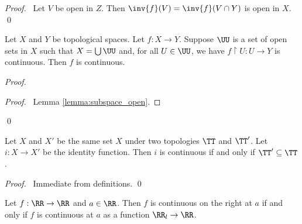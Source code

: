 \begin{proof}
    \pf\ Let $V$ be open in $Z$. Then $\inv{f}(V) = \inv{f}(V \cap Y)$ is open in $X$. \qed
\end{proof}

\begin{theorem}
    Let $X$ and $Y$ be topological spaces. Let $f : X \rightarrow Y$. Suppose $\UU$ is a set of open sets
    in $X$ such that $X = \bigcup \UU$ and, for all $U \in \UU$, we have $f \restriction U : U \rightarrow Y$
    is continuous. Then $f$ is continuous.
\end{theorem}

\begin{proof}
    \pf
    \begin{proof}
        \pf\ Lemma \ref{lemma:subspace_open}.
    \end{proof}
    \qed
\end{proof}

\begin{proposition}
    Let $X$ and $X'$ be the same set $X$ under two topologies $\TT$ and $\TT'$. Let $i : X \rightarrow X'$
    be the identity function. Then $i$ is continuous if and only if $\TT' \subseteq \TT$.
\end{proposition}

\begin{proof}
    \pf\ Immediate from definitions. \qed
\end{proof}

\begin{proposition}
    Let $f : \RR \rightarrow \RR$ and $a \in \RR$. Then $f$ is continuous on the right at $a$ if and only if
    $f$ is continuous at $a$ as a function $\RR_l \rightarrow \RR$.
\end{proposition}

